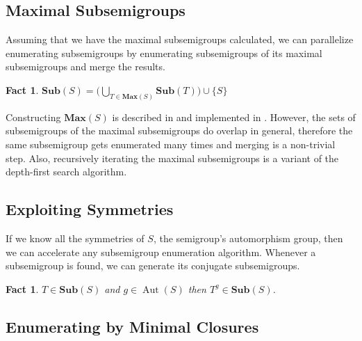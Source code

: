 \documentclass{amsart}
\newcommand{\Sub}{\mathbf{Sub}}
\newcommand{\Max}{\mathbf{Max}}
\DeclareMathOperator{\Aut}{Aut}
\theoremstyle{plain}
\newtheorem{fact}[theorem]{Fact}
\theoremstyle{definition}
\begin{document}
\subsection{Maximal Subsemigroups}
Assuming that we have the maximal subsemigroups calculated, we can parallelize enumerating subsemigroups by enumerating subsemigroups of its maximal subsemigroups and merge the results.
\begin{fact}
$\Sub(S)=\big( \bigcup_{T\in \Max(S)}\Sub(T)\big)\cup \{S\}$
\end{fact}
\noindent Constructing $\Max(S)$ is described in \cite{MaxSubSemi} and implemented in \cite{Semigroups}.
However, the sets of subsemigroups of the maximal subsemigroups do overlap in general, therefore the same subsemigroup gets enumerated many times and merging is a non-trivial step.
Also, recursively iterating the maximal subsemigroups is a variant of the depth-first search algorithm.  

\subsection{Exploiting Symmetries}
If we know all the symmetries of $S$, the semigroup's automorphism group, then we can accelerate any subsemigroup enumeration algorithm.
Whenever a subsemigroup is found, we can generate its conjugate subsemigroups.
\begin{fact}
$T\in\Sub(S)$ and $g\in \Aut(S)$ then $T^g\in\Sub(S)$.%
\end{fact}


\subsection{Enumerating by Minimal Closures}
\end{document}
